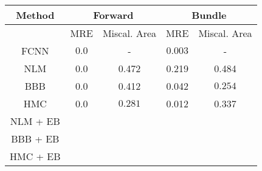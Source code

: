 \documentclass[convert={outext=.png}]{standalone}
\begin{document}
\begin{tabular}{c c c c c}
\hline
\hline
Method &  \multicolumn{2}{c}{Forward} & \multicolumn{2}{c}{Bundle} \\ \hline
 & MRE & Miscal. Area & MRE & Miscal. Area \\
 FCNN & $\mathbf{0.0}$ & - & $\mathbf{0.003}$ & - \\
 \hline
 NLM & 0.0 & 0.472 & 0.219 & 0.484 \\
 BBB & 0.0 & 0.412 & 0.042 & $\mathbf{0.254}$ \\
 HMC & 0.0 & $\mathbf{0.281}$ & 0.012 & 0.337 \\
 \hline
 NLM + EB &  &  &  &  \\
 BBB + EB &  &  &  &  \\
 HMC + EB &  &  &  &  \\
\hline
\hline
\end{tabular}
\end{document}
